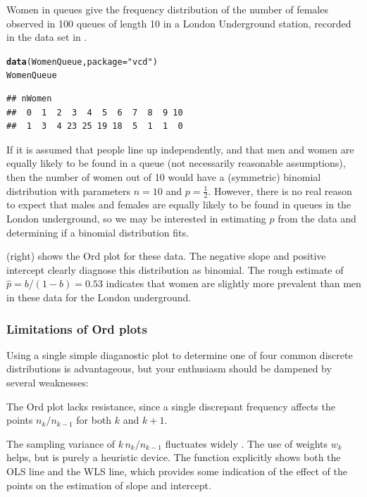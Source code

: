 \documentclass[11pt]{book}\usepackage[]{graphicx}\usepackage[]{color}
\makeatletter
\newcommand{\hlstr}[1]{\textcolor[rgb]{0.192,0.494,0.8}{#1}}%
\newcommand{\hlstd}[1]{\textcolor[rgb]{0.345,0.345,0.345}{#1}}%
\newcommand{\hlkwc}[1]{\textcolor[rgb]{0.333,0.667,0.333}{#1}}%
\newcommand{\hlkwd}[1]{\textcolor[rgb]{0.737,0.353,0.396}{\textbf{#1}}}%
\newenvironment{kframe}{%
 \def\at@end@of@kframe{}%
 \ifinner\ifhmode%
  \def\at@end@of@kframe{\end{minipage}}%
  \begin{minipage}{\columnwidth}%
 \fi\fi%
 \def\FrameCommand##1{\hskip\@totalleftmargin \hskip-\fboxsep
 \colorbox{shadecolor}{##1}\hskip-\fboxsep
     \hskip-\linewidth \hskip-\@totalleftmargin \hskip\columnwidth}%
 \MakeFramed {\advance\hsize-\width
   \@totalleftmargin\z@ \linewidth\hsize
   \@setminipage}}%
 {\par\unskip\endMakeFramed%
 \at@end@of@kframe}
\newenvironment{knitrout}{}{} %
\renewenvironment{knitrout}{\small\renewcommand{\baselinestretch}{.85}}{} %
\makeatother
\begin{document}
\begin{Example}[queues]{Women in queues}
\citet{JinkinsonSlater:81,HoaglinTukey:85}
give the frequency distribution of the number of females observed in 100
queues of length 10 in a London Underground station, recorded
in the data set  in .
\begin{knitrout}
\color{fgcolor}\begin{kframe}
\begin{alltt}
\hlkwd{data}\hlstd{(WomenQueue,} \hlkwc{package}\hlstd{=}\hlstr{"vcd"}\hlstd{)}
\hlstd{WomenQueue}
\end{alltt}
\begin{verbatim}
## nWomen
##  0  1  2  3  4  5  6  7  8  9 10 
##  1  3  4 23 25 19 18  5  1  1  0
\end{verbatim}
\end{kframe}
\end{knitrout}


If it is assumed that people line up independently, and that
men and women are equally likely to be found in a queue
(not necessarily reasonable assumptions),
then the number of women out of 10
would have a (symmetric) binomial distribution with parameters $n=10$ and
$p=\frac12$.
However, there is no real reason to expect that males and females are
equally likely to be found in queues in the London underground,
so we may be interested in estimating $p$ from the data
and determining if a binomial distribution fits.

 (right) shows the Ord plot for these data.
The negative slope and positive intercept clearly diagnose this distribution
as binomial.  The rough estimate of $\hat{p} = b/(1-b) = 0.53$ indicates that
women are slightly more prevalent than men in these data for the London 
underground. 
\end{Example}

\subsubsection{Limitations of Ord plots}
Using a single simple diaganostic plot to determine one of four common discrete
distributions is advantageous, but your enthusiasm should be
dampened by several weaknesses:

\begin{itemize*}
\item The Ord plot lacks resistance, since a single discrepant
       frequency affects the points $n_k / n_{k-1}$
       for both \(k\) and \(k  +  1\).

\item The sampling variance of \(k \,  n_k /  n_{k-1}\) fluctuates
       widely
       \citep{HoaglinTukey:85,JinkinsonSlater:81}.  
       The use of weights \(w_k\) helps, but is purely a
       heuristic device. The  function explicitly shows both
       the OLS line and the WLS line, which provides some indication of the
       effect of the points on the estimation of slope and intercept.
\end{itemize*}
\end{document}
